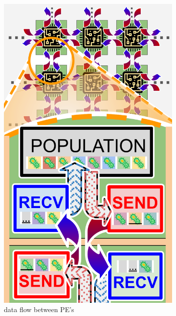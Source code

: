 \begin{figure}
  \centering
  \begin{subfigure}{0.5\linewidth}
    \centering
    \footnotesize
    \includegraphics[width=0.8\linewidth]{img/dataflow-schematic}
    \vspace{-0.05in}
    \caption{data flow between PE's}
  \end{subfigure}%
  \begin{subfigure}{0.5\linewidth}
    \footnotesize
    \centering

\end{subfigure}
\end{figure}
